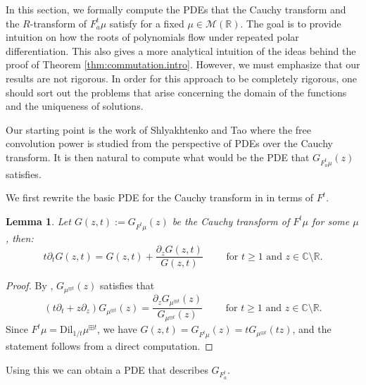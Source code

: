 \documentclass[reqno,11pt]{amsart}
\newtheorem{lemma}[theorem]{Lemma}
\theoremstyle{remark}
\newcommand{\cc}{\mathbb{C}}
\newcommand{\rr}{\mathbb{R}}
\newcommand{\MM}{\mathcal{M}}
\newcommand{\dil}[1]{\mbox{Dil}_{#1}}
\newcommand{\freepower}[1]{F^{#1}}
\newcommand{\pfreepower}[2]{F_{#1}^{#2}}
\begin{document}
In this section, we formally compute the PDEs that the Cauchy transform and the $R$-transform of $\pfreepower{a}{t}\mu$ satisfy for a fixed $\mu\in \MM(\rr)$. The goal is to provide intuition on how the roots of polynomials flow under repeated polar differentiation. This also gives a more analytical intuition of the ideas behind the proof of Theorem \ref{thm:commutation.intro}. However, we must emphasize that our results are not rigorous. In order for this approach to be completely rigorous, one should sort out the problems that arise concerning the domain of the functions and the uniqueness of solutions.

Our starting point is the work of Shlyakhtenko and Tao \cite{shlyakhtenko2022fractional} where the free convolution power is studied from the perspective of PDEs over the Cauchy transform. It is then natural to compute what would be the PDE that $ G_{\pfreepower{a}{t}\mu}(z) $ satisfies.

We first rewrite the basic PDE for the Cauchy transform in \cite{shlyakhtenko2022fractional} in terms of $\freepower{t}$.

\begin{lemma}
\label{lem.ST}
Let $ G(z,t) := G_{ \freepower{t}\mu }(z) $ be the Cauchy transform of $\freepower{t}\mu$ for some $\mu$, then:
$$t\partial_t G(z,t) = G(z,t) +\frac{\partial_z G(z,t)}{G(z,t)} \qquad \text{ for } t\geq 1 \text{ and } z \in \cc\setminus\rr. $$

\end{lemma}
\begin{proof}
By \cite[Equation (1.17)]{shlyakhtenko2022fractional}, $ G_{\mu^{\boxplus t}}(z) $ satisfies that
$$ (t\partial_t + z\partial_z)G_{\mu^{\boxplus t}}(z) = \frac{\partial_z G_{\mu^{\boxplus t}}(z) }{G_{\mu^{\boxplus t}}(z)} \qquad \text{ for } t\geq 1 \text{ and } z \in \cc\setminus\rr .$$ 
Since $ \freepower{t}\mu = \dil{1/t}\mu^{\boxplus t}$, we have
$G(z,t)= G_{ \freepower{t}\mu }(z) = tG_{\mu^{\boxplus t}}(tz) $, and the statement follows from a direct computation.
\end{proof}

Using this we can  obtain a PDE that describes $G_{\pfreepower{a}{t}}$. 
\end{document}
